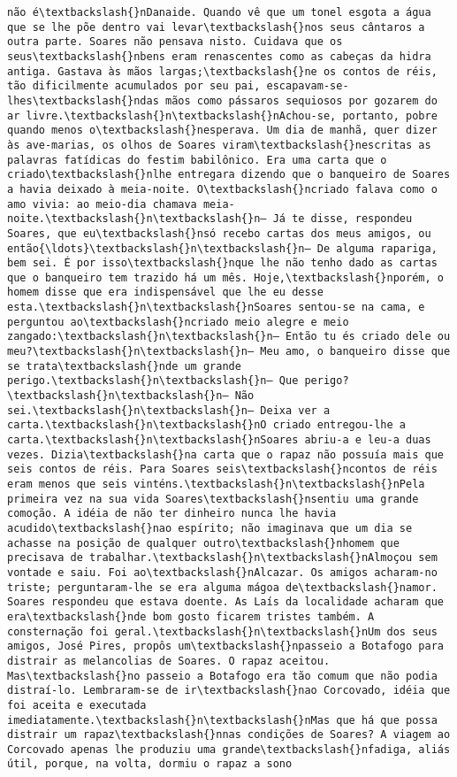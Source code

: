 \documentclass[11pt]{article}
\begin{document}
\begin{Verbatim}[commandchars=\\\{\}]
não é\textbackslash{}nDanaide. Quando vê que um tonel esgota a água que se lhe põe dentro vai levar\textbackslash{}nos seus cântaros a outra parte. Soares não pensava nisto. Cuidava que os seus\textbackslash{}nbens eram renascentes como as cabeças da hidra antiga. Gastava às mãos largas;\textbackslash{}ne os contos de réis, tão dificilmente acumulados por seu pai, escapavam-se-lhes\textbackslash{}ndas mãos como pássaros sequiosos por gozarem do ar livre.\textbackslash{}n\textbackslash{}nAchou-se, portanto, pobre quando menos o\textbackslash{}nesperava. Um dia de manhã, quer dizer às ave-marias, os olhos de Soares viram\textbackslash{}nescritas as palavras fatídicas do festim babilônico. Era uma carta que o criado\textbackslash{}nlhe entregara dizendo que o banqueiro de Soares a havia deixado à meia-noite. O\textbackslash{}ncriado falava como o amo vivia: ao meio-dia chamava meia-noite.\textbackslash{}n\textbackslash{}n— Já te disse, respondeu Soares, que eu\textbackslash{}nsó recebo cartas dos meus amigos, ou então{\ldots}\textbackslash{}n\textbackslash{}n— De alguma rapariga, bem sei. É por isso\textbackslash{}nque lhe não tenho dado as cartas que o banqueiro tem trazido há um mês. Hoje,\textbackslash{}nporém, o homem disse que era indispensável que lhe eu desse esta.\textbackslash{}n\textbackslash{}nSoares sentou-se na cama, e perguntou ao\textbackslash{}ncriado meio alegre e meio zangado:\textbackslash{}n\textbackslash{}n— Então tu és criado dele ou meu?\textbackslash{}n\textbackslash{}n— Meu amo, o banqueiro disse que se trata\textbackslash{}nde um grande perigo.\textbackslash{}n\textbackslash{}n— Que perigo?\textbackslash{}n\textbackslash{}n— Não sei.\textbackslash{}n\textbackslash{}n— Deixa ver a carta.\textbackslash{}n\textbackslash{}nO criado entregou-lhe a carta.\textbackslash{}n\textbackslash{}nSoares abriu-a e leu-a duas vezes. Dizia\textbackslash{}na carta que o rapaz não possuía mais que seis contos de réis. Para Soares seis\textbackslash{}ncontos de réis eram menos que seis vinténs.\textbackslash{}n\textbackslash{}nPela primeira vez na sua vida Soares\textbackslash{}nsentiu uma grande comoção. A idéia de não ter dinheiro nunca lhe havia acudido\textbackslash{}nao espírito; não imaginava que um dia se achasse na posição de qualquer outro\textbackslash{}nhomem que precisava de trabalhar.\textbackslash{}n\textbackslash{}nAlmoçou sem vontade e saiu. Foi ao\textbackslash{}nAlcazar. Os amigos acharam-no triste; perguntaram-lhe se era alguma mágoa de\textbackslash{}namor. Soares respondeu que estava doente. As Laís da localidade acharam que era\textbackslash{}nde bom gosto ficarem tristes também. A consternação foi geral.\textbackslash{}n\textbackslash{}nUm dos seus amigos, José Pires, propôs um\textbackslash{}npasseio a Botafogo para distrair as melancolias de Soares. O rapaz aceitou. Mas\textbackslash{}no passeio a Botafogo era tão comum que não podia distraí-lo. Lembraram-se de ir\textbackslash{}nao Corcovado, idéia que foi aceita e executada imediatamente.\textbackslash{}n\textbackslash{}nMas que há que possa distrair um rapaz\textbackslash{}nnas condições de Soares? A viagem ao Corcovado apenas lhe produziu uma grande\textbackslash{}nfadiga, aliás útil, porque, na volta, dormiu o rapaz a sono 
\end{Verbatim}
\end{document}
